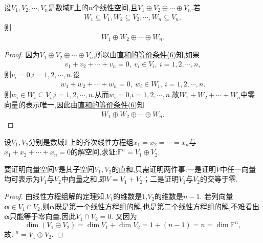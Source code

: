 \documentclass[../../main.tex]{subfiles}%
\begin{document}
\begin{proposition}\label{proposition:直和分解的每个子空间的和还是直和}
设$V_1,V_2,\cdots,V_n$是数域$\mathbb{F}$上的$n$个线性空间,且$V_1\oplus V_2\oplus \cdots \oplus V_n$.若
\begin{align*}
W_1\subseteq V_1,W_2\subseteq V_2,\cdots ,W_n\subseteq V_n,
\end{align*}
则
\begin{align*}
W_1\oplus W_2\oplus \cdots \oplus W_n.
\end{align*}
\end{proposition}
\begin{proof}

因为$V_1\oplus V_2\oplus \cdots \oplus V_n$,所以由\hyperref[theorem:直和的等价条件]{直和的等价条件(6)}知,如果
\begin{align*}
v_1+v_2+\cdots +v_n=0,\ v_i\in V_i,\ i=1,2,\cdots,n,
\end{align*}
则$v_i=0$,$i=1,2,\cdots,n$.设
\begin{align*}
w_1+w_2+\cdots +w_n=0,\ w_i\in W_i,\ i=1,2,\cdots,n.
\end{align*}
则$w_i\in W_i\subseteq V_i$,$i=1,2,\cdots,n$.从而$w_i=0$,$i=1,2,\cdots,n$.故$W_1+W_2+\cdots +W_n$中零向量的表示唯一,因此由\hyperref[theorem:直和的等价条件]{直和的等价条件(6)}知
\begin{align*}
W_1\oplus W_2\oplus \cdots \oplus W_n.
\end{align*}

\end{proof}

\begin{example}
设\(V_1,V_2\)分别是数域\(\mathbb{F}\)上的齐次线性方程组\(x_1 = x_2=\cdots = x_n\)与\(x_1 + x_2+\cdots + x_n = 0\)的解空间,求证:\(\mathbb{F}^n = V_1\oplus V_2\).
\end{example}
\begin{note}
要证明向量空间\(V\)是其子空间\(V_1,V_2\)的直和,只需证明两件事:一是证明\(V\)中任一向量均可表示为\(V_1\)与\(V_2\)中向量之和,即\(V = V_1 + V_2\)；二是证明\(V_1\)与\(V_2\)的交等于零.
\end{note}
\begin{proof}

由线性方程组解的定理知,\(V_1\)的维数是\(1\),\(V_2\)的维数是\(n - 1\). 若列向量\(\boldsymbol{\alpha}\in V_1\cap V_2\),则\(\boldsymbol{\alpha}\)既是第一个线性方程组的解,也是第二个线性方程组的解,不难看出\(\boldsymbol{\alpha}\)只能等于零向量,因此\(V_1\cap V_2 = 0\). 又因为
\[
\dim(V_1\oplus V_2)=\dim V_1+\dim V_2=1+(n - 1)=n=\dim\mathbb{F}^n,
\]
故\(\mathbb{F}^n = V_1\oplus V_2\).


\end{proof}
\end{document}
